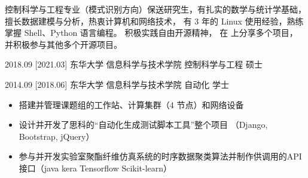 \documentclass[zh]{resume}
\begin{document}
\makeheader

{\onehalfspacing\hspace{2em}%
控制科学与工程专业（模式识别方向）保送研究生，有扎实的数学与统计学基础，
擅长数据建模与分析，热衷计算机和网络技术，
有 3 年的 Linux 使用经验，熟练掌握 Shell、Python 语言编程。
积极实践自由开源精神，
在  上分享多个项目，
并积极参与其他多个开源项目。
\par}

\begin{competences}
    
\end{competences}

\begin{educations}
  \education%
    {2018.09}%
    [2021.03]%
    {东华大学}%
    {信息科学与技术学院}%
    {控制科学与工程}%
    {硕士}

  \separator{0.5ex}
  \education%
    {2014.09}%
    [2018.06]%
    {东华大学}%
    {信息科学与技术学院}%
    {自动化}%
    {学士}
\end{educations}

\begin{itemize}  
  \item 搭建并管理课题组的工作站、计算集群（4 节点）和网络设备  
  \item 设计并开发了思科的\enquote{自动化生成测试脚本工具}整个项目
    （Django, Bootstrap, jQuery）
  \item 参与并开发实验室聚酯纤维仿真系统的时序数据聚类算法并制作供调用的API接口（java kera Tensorflow Scikit-learn）
\end{itemize}
\end{document}
